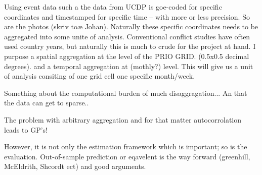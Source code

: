 \documentclass[a4paper]{article}
\begin{document}
Using event data such a the data from UCDP is goe-coded for specific coordinates and timestamped for specific time -- with more or less precision. So are the photos (skriv toæ Johan). Naturally these specific coordinates needs to be aggregated into some unite of analysis. Conventional conflict studies have often used country years, but naturally this is much to crude for the project at hand. I purpose a spatial aggregation at the level of the PRIO GRID. (0.5x0.5 decimal degrees). and a temporal aggregation at (mothly?) level. This will give us a unit of analysis consiting of one grid cell one specific month/week. 

Something about the computational burden of much disaggragation... An that the data can get to sparse..

The problem with arbitrary aggregation and for that matter autocorrolation leads to GP's!


However, it is not only the estimation framework which is important; so is the evaluation. Out-of-sample prediction or eqavelent is the way forward (greenhill, McEldrith, Shcordt ect) and good arguments.







\end{document}

